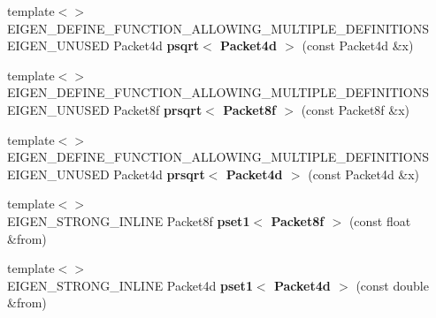 \begin{DoxyCompactItemize}
\item 
\mbox{\label{namespace_eigen_1_1internal_a96f6b29d5043f43457b76a769bae8236}} 
{\footnotesize template$<$$>$ }\\E\+I\+G\+E\+N\+\_\+\+D\+E\+F\+I\+N\+E\+\_\+\+F\+U\+N\+C\+T\+I\+O\+N\+\_\+\+A\+L\+L\+O\+W\+I\+N\+G\+\_\+\+M\+U\+L\+T\+I\+P\+L\+E\+\_\+\+D\+E\+F\+I\+N\+I\+T\+I\+O\+NS E\+I\+G\+E\+N\+\_\+\+U\+N\+U\+S\+ED Packet4d {\bfseries psqrt$<$ Packet4d $>$} (const Packet4d \&x)
\item 
\mbox{\label{namespace_eigen_1_1internal_a636a9eb228d5c70e27417c4b736eb6cf}} 
{\footnotesize template$<$$>$ }\\E\+I\+G\+E\+N\+\_\+\+D\+E\+F\+I\+N\+E\+\_\+\+F\+U\+N\+C\+T\+I\+O\+N\+\_\+\+A\+L\+L\+O\+W\+I\+N\+G\+\_\+\+M\+U\+L\+T\+I\+P\+L\+E\+\_\+\+D\+E\+F\+I\+N\+I\+T\+I\+O\+NS E\+I\+G\+E\+N\+\_\+\+U\+N\+U\+S\+ED Packet8f {\bfseries prsqrt$<$ Packet8f $>$} (const Packet8f \&x)
\item 
\mbox{\label{namespace_eigen_1_1internal_af8bedd8df1a65eb70af9e8610ab63fcc}} 
{\footnotesize template$<$$>$ }\\E\+I\+G\+E\+N\+\_\+\+D\+E\+F\+I\+N\+E\+\_\+\+F\+U\+N\+C\+T\+I\+O\+N\+\_\+\+A\+L\+L\+O\+W\+I\+N\+G\+\_\+\+M\+U\+L\+T\+I\+P\+L\+E\+\_\+\+D\+E\+F\+I\+N\+I\+T\+I\+O\+NS E\+I\+G\+E\+N\+\_\+\+U\+N\+U\+S\+ED Packet4d {\bfseries prsqrt$<$ Packet4d $>$} (const Packet4d \&x)
\item 
\mbox{\label{namespace_eigen_1_1internal_aebd48a44632684b76d977ace529558a4}} 
{\footnotesize template$<$$>$ }\\E\+I\+G\+E\+N\+\_\+\+S\+T\+R\+O\+N\+G\+\_\+\+I\+N\+L\+I\+NE Packet8f {\bfseries pset1$<$ Packet8f $>$} (const float \&from)
\item 
\mbox{\label{namespace_eigen_1_1internal_a199c447b5f7d2696177268d5936c8144}} 
{\footnotesize template$<$$>$ }\\E\+I\+G\+E\+N\+\_\+\+S\+T\+R\+O\+N\+G\+\_\+\+I\+N\+L\+I\+NE Packet4d {\bfseries pset1$<$ Packet4d $>$} (const double \&from)
\item 
\mbox{\label{namespace_eigen_1_1internal_a229694f3bfcf92ddc911da58097002f7}} 

\end{DoxyCompactItemize}
